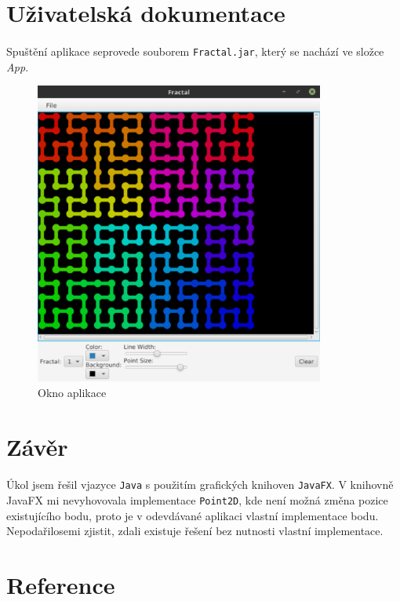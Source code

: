 \documentclass[12pt]{scrartcl}
\begin{document}
\newpage
\section{Uživatelská dokumentace}

\paragraph{}
Spuštění aplikace se\nobreakspace provede souborem \texttt{Fractal.jar}, který se nachází ve složce \emph{App}.

\begin{figure}[!ht]
	\centering
	\label{obr:polekolizi}
	\includegraphics[width=0.85\textwidth,natwidth=1,natheight=1]{app_gui.pdf}
	\caption{Okno aplikace}
\end{figure}

\newpage
\section{Závěr}
\paragraph{}
Úkol jsem řešil v\nobreakspace jazyce \texttt{Java} s použitím grafických knihoven \texttt{JavaFX}. V knihovně JavaFX mi nevyhovovala implementace \texttt{Point2D}, kde není možná změna pozice existujícího bodu, proto je v odevdávané aplikaci vlastní implementace bodu. Nepodařilo\nobreakspace se\nobreakspace mi zjistit, zdali existuje řešení bez nutnosti vlastní implementace.

\section{Reference}
\end{document}
